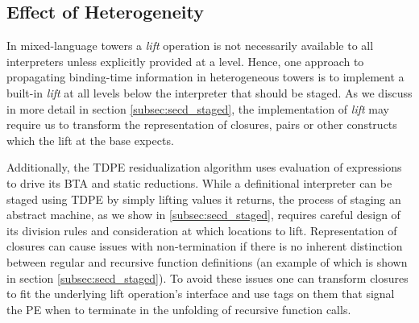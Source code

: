 \documentclass[a4paper,12pt,twoside,openright]{report}
\theoremstyle{definition}
\begin{document}
\subsection{Effect of Heterogeneity}
In mixed-language towers a \textit{lift} operation is not necessarily available to all interpreters unless explicitly provided at a level. Hence, one approach to propagating binding-time information in heterogeneous towers is to implement a built-in \textit{lift} at all levels below the interpreter that should be staged. As we discuss in more detail in section \ref{subsec:secd_staged}, the implementation of \textit{lift} may require us to transform the representation of closures, pairs or other constructs which the lift at the base expects.

Additionally, the TDPE residualization algorithm uses evaluation of expressions to drive its BTA and static reductions. While a definitional interpreter can be staged using TDPE by simply lifting values it returns, the process of staging an abstract machine, as we show in \ref{subsec:secd_staged}, requires careful design of its division rules and consideration at which locations to lift. Representation of closures can cause issues with non-termination if there is no inherent distinction between regular and recursive function definitions (an example of which is shown in section \ref{subsec:secd_staged}). To avoid these issues one can transform closures to fit the underlying lift operation's interface and use tags on them that signal the PE when to terminate in the unfolding of recursive function calls.




\end{document}

